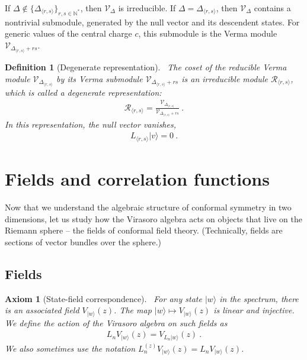 \documentclass[12pt, a4paper]{article}
\theoremstyle{break}
\newtheorem{hyp}[exo]{Axiom}
\newtheorem{defn}[exo]{Definition}
\begin{document}
If $\Delta\notin\{\Delta_{\langle r,s\rangle}\}_{r,s\in\mathbb{N}^*}$, then $\mathcal V_\Delta$ is irreducible. If $\Delta = \Delta_{\langle r,s\rangle}$, then $\mathcal V_\Delta$ contains a nontrivial submodule, generated by the null vector and its descendent states. For generic values of the central charge $c$, this submodule is the Verma module $\mathcal V_{\Delta_{\langle r,s\rangle}+rs}$.

\begin{defn}[Degenerate representation]
 ~\label{def:deg}
The coset of the reducible Verma module $\mathcal V_{\Delta_{\langle r,s\rangle}}$ by its Verma submodule $\mathcal V_{\Delta_{\langle r,s\rangle}+rs}$ is an irreducible module $\mathcal{R}_{\langle r,s\rangle}$, which is called a degenerate representation:
\begin{align}
 \mathcal{R}_{\langle r,s\rangle} = \frac{\mathcal V_{\Delta_{\langle r,s\rangle}}}{\mathcal V_{\Delta_{\langle r,s\rangle}+rs}}\ .
\end{align}
In this representation, the null vector vanishes,
\begin{align}
 L_{\langle r,s\rangle}|v\rangle = 0\ .
\end{align}
\end{defn}


\section{Fields and correlation functions}\label{sec:cft}

Now that we understand the algebraic structure of conformal symmetry in two dimensions, let us study how the Virasoro algebra acts on objects that live on the Riemann sphere -- the fields of conformal field theory. (Technically, fields are sections of vector bundles over the sphere.)

\subsection{Fields}

\begin{hyp}[State-field correspondence]
 ~\label{hyp:sfc}
For any state $|w\rangle$ in the spectrum, there is an associated field $V_{|w\rangle}(z)$. The map $|w\rangle \mapsto V_{|w\rangle}(z)$ is linear and injective. We define the action of the Virasoro algebra on such fields as 
\begin{align}
 L_n V_{|w\rangle}(z) =   V_{L_n|w\rangle}(z)\ .
\end{align}
We also sometimes use the notation $L_n^{(z)} V_{|w\rangle}(z)=L_n V_{|w\rangle}(z)$. 
\end{hyp}
\end{document}
